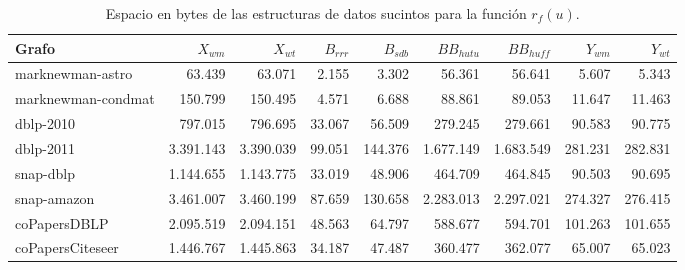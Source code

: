 \begin{table}[t]
	\caption{Espacio en bytes de las estructuras de datos sucintos para la función $r_{f}(u)$.}
	\label{table:sdslBitsRf}
	\centering
	\footnotesize
	\begin{tabular}{l||r|r||r|r||r|r||r|r}
		\toprule
		Grafo & $X_{wm}$ & $X_{wt}$ & $B_{rrr}$ & $B_{sdb}$ & $BB_{hutu}$ & $BB_{huff}$ & $Y_{wm}$ & $Y_{wt}$ \\
		\midrule
		marknewman-astro & 63.439 & 63.071 & 2.155 & 3.302 & 56.361 & 56.641 & 5.607 & 5.343 \\
        marknewman-condmat & 150.799 & 150.495 & 4.571 & 6.688 & 88.861 & 89.053 & 11.647 & 11.463 \\
        dblp-2010 & 797.015 & 796.695 & 33.067 & 56.509 & 279.245 & 279.661 & 90.583 & 90.775 \\
        dblp-2011 & 3.391.143 & 3.390.039 & 99.051 & 144.376 & 1.677.149 & 1.683.549 & 281.231 & 282.831 \\
        snap-dblp & 1.144.655 & 1.143.775 & 33.019 & 48.906 & 464.709 & 464.845 & 90.503 & 90.695 \\
        snap-amazon & 3.461.007 & 3.460.199 & 87.659 & 130.658 & 2.283.013 & 2.297.021 & 274.327 & 276.415 \\
        coPapersDBLP & 2.095.519 & 2.094.151 & 48.563 & 64.797 & 588.677 & 594.701 & 101.263 & 101.655 \\
        coPapersCiteseer & 1.446.767 & 1.445.863 & 34.187 & 47.487 & 360.477 & 362.077 & 65.007 & 65.023 \\
        \bottomrule
	\end{tabular}
\end{table}
